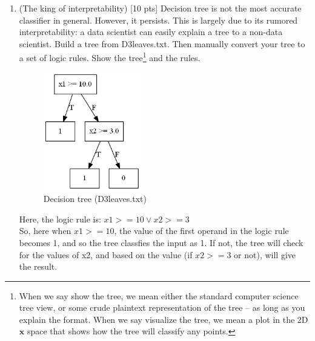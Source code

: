 \documentclass[a4paper]{article}
\theoremstyle{definition}
\def\x{\mathbf x}
\newenvironment{soln}{
    \leavevmode\color{blue}\ignorespaces
}{}
\begin{document}
\begin{enumerate}
\item (The king of interpretability)  [10 pts] Decision tree is not the most accurate classifier in general.  However, it persists.  This is largely due to its rumored interpretability: a data scientist can easily explain a tree to a non-data scientist.  Build a tree from D3leaves.txt.  Then manually convert your tree to a set of logic rules.  Show the tree\footnote{When we say show the tree, we mean either the standard computer science tree view, or some crude plaintext representation of the tree -- as long as you explain the format.  When we say visualize the tree, we mean a plot in the 2D $\x$ space that shows how the tree will classify any points.} and the rules.
\begin{soln}
	 \begin{figure}[h!]
	        \centering
	        \includegraphics[width=0.4\textwidth]{D3leaves.png} 
	        \captionsetup{labelformat=empty}
	        \caption{Decision tree (D3leaves.txt)}
	        \label{fig:Decision tree (D3leaves.txt)}
	   \end{figure}

	Here, the logic rule is: $ x1 >= 10 \vee x2 >= 3 $ 
\\So, here when $x1 >= 10 $, the value of the first operand in the logic rule becomes 1, and so the tree classfies the input as 1. If not, the tree will check for the values of x2, and based on the value (if $x2 >= 3 $ or not), will give the result.

\end{soln}


\end{enumerate}
\end{document}
